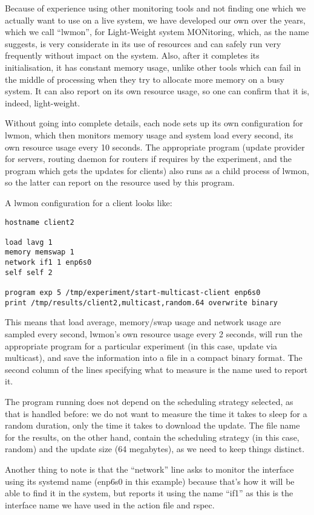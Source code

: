 \documentclass[a4paper,12pt]{article}
\begin{document}
Because of experience using other monitoring tools and not finding
one which we actually want to use on a live system, we have developed
our own over the years, which we call ``lwmon'', for Light-Weight
system MONitoring, which, as the name suggests, is very considerate
in its use of resources and can safely run very frequently without
impact on the system.  Also, after it completes its initialisation,
it has constant memory usage, unlike other tools which can fail
in the middle of processing when they try to allocate more memory
on a busy system.  It can also report on its own resource usage,
so one can confirm that it is, indeed, light-weight.

Without going into complete details, each node sets up its own
configuration for lwmon, which then monitors memory usage and
system load every second, its own resource usage every 10
seconds.  The appropriate program (update provider for servers,
routing daemon for routers if requires by the experiment, and
the program which gets the updates for clients) also runs as
a child process of lwmon, so the latter can report on the resource
used by this program.

A lwmon configuration for a client looks like:

\begin{verbatim}
hostname client2

load lavg 1
memory memswap 1
network if1 1 enp6s0
self self 2

program exp 5 /tmp/experiment/start-multicast-client enp6s0
print /tmp/results/client2,multicast,random.64 overwrite binary
\end{verbatim}

This means that load average, memory/swap usage and network usage are
sampled every second, lwmon's own resource usage every 2 seconds, will
run the appropriate program for a particular experiment (in this case,
update via multicast), and save the information into a file in a compact
binary format. The second column of the lines specifying what to measure
is the name used to report it.

The program running does not depend on the scheduling strategy selected,
as that is handled before: we do not want to measure the time it takes
to sleep for a random duration, only the time it takes to download the
update.  The file name for the results, on the other hand, contain the
scheduling strategy (in this case, random) and the update size (64
megabytes), as we need to keep things distinct.

Another thing to note is that the ``network'' line asks to monitor
the interface using its systemd name (enp6s0 in this example) because
that's how it will be able to find it in the system, but reports it
using the name ``if1'' as this is the interface name we have used
in the action file and rspec.
\end{document}
